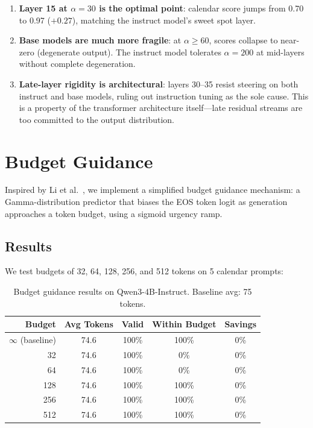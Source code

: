 \documentclass[11pt,a4paper]{article}
\begin{document}
\begin{enumerate}
    \item \textbf{Layer 15 at $\alpha=30$ is the optimal point}: calendar score jumps from 0.70 to 0.97 ($+0.27$), matching the instruct model's sweet spot layer.
    \item \textbf{Base models are much more fragile}: at $\alpha \geq 60$, scores collapse to near-zero (degenerate output). The instruct model tolerates $\alpha=200$ at mid-layers without complete degeneration.
    \item \textbf{Late-layer rigidity is architectural}: layers 30--35 resist steering on both instruct and base models, ruling out instruction tuning as the sole cause. This is a property of the transformer architecture itself---late residual streams are too committed to the output distribution.
\end{enumerate}

\section{Budget Guidance}
\label{sec:budget}

Inspired by Li et al.~\cite{li2025budget}, we implement a simplified budget guidance mechanism: a Gamma-distribution predictor that biases the EOS token logit as generation approaches a token budget, using a sigmoid urgency ramp.

\subsection{Results}

We test budgets of 32, 64, 128, 256, and 512 tokens on 5 calendar prompts:

\begin{table}[H]
\centering
\caption{Budget guidance results on Qwen3-4B-Instruct. Baseline avg: 75 tokens.}
\label{tab:budget}
\begin{tabular}{rcccc}
\toprule
\textbf{Budget} & \textbf{Avg Tokens} & \textbf{Valid} & \textbf{Within Budget} & \textbf{Savings} \\
\midrule
$\infty$ (baseline) & 74.6 & 100\% & 100\% & 0\% \\
32 & 74.6 & 100\% & 0\% & 0\% \\
64 & 74.6 & 100\% & 0\% & 0\% \\
128 & 74.6 & 100\% & 100\% & 0\% \\
256 & 74.6 & 100\% & 100\% & 0\% \\
512 & 74.6 & 100\% & 100\% & 0\% \\
\bottomrule
\end{tabular}
\end{table}
\end{document}
